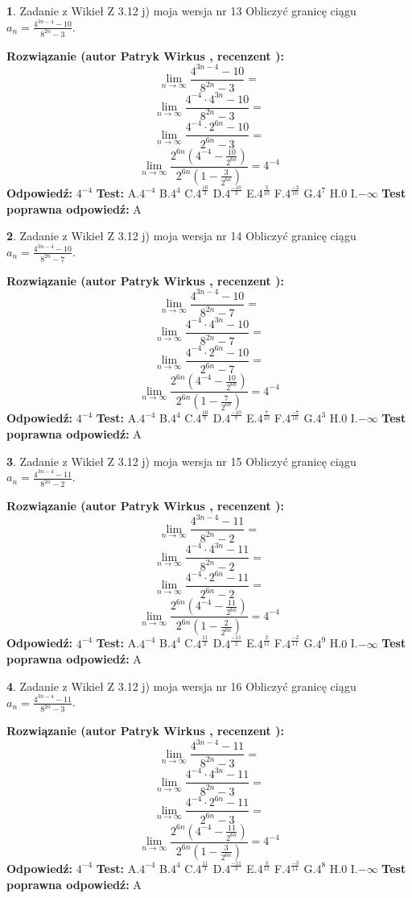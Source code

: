\documentclass[12pt, a4paper]{article}
\theoremstyle{definition} %
\newtheorem{zad}{}
\newcommand{\zadStart}[1]{\begin{zad}#1\newline}
\newcommand{\zadStop}{\end{zad}}
\newcommand{\rozwStart}[2]{\noindent \textbf{Rozwiązanie (autor #1 , recenzent #2): }\newline}
\newcommand{\rozwStop}{\newline}
\newcommand{\odpStart}{\noindent \textbf{Odpowiedź:}\newline}
\newcommand{\odpStop}{\newline}
\newcommand{\testStart}{\noindent \textbf{Test:}\newline}
\newcommand{\testStop}{\newline}
\newcommand{\kluczStart}{\noindent \textbf{Test poprawna odpowiedź:}\newline}
\newcommand{\kluczStop}{\newline}
\begin{document}
\zadStart{Zadanie z Wikieł Z 3.12 j) moja wersja nr 13}
Obliczyć granicę ciągu $a_{n}=\frac{4^{3n-4}-10}{8^{2n}-3}$.
\zadStop
\rozwStart{Patryk Wirkus}{}
$$\lim\limits_{n\to\infty}\frac{4^{3n-4}-10}{8^{2n}-3}=$$
$$\lim\limits_{n\to\infty}\frac{4^{-4} \cdot 4^{3n}-10}{8^{2n}-3}=$$
$$\lim\limits_{n\to\infty}\frac{4^{-4} \cdot 2^{6n}-10}{2^{6n}-3}=$$
$$\lim\limits_{n\to\infty}\frac{2^{6n}(4^{-4} - \frac{10}{2^{6n}})}{2^{6n}(1-\frac{3}{2^{6n}})}= 4^{-4}$$
\rozwStop
\odpStart
$4^{-4}$
\odpStop
\testStart
A.$4^{-4}$
B.$4^{4}$
C.$4^{\frac{10}{3}}$
D.$4^{\frac{-10}{3}}$
E.$4^{\frac{3}{10}}$
F.$4^{\frac{-3}{10}}$
G.$4^{7}$
H.$0$
I.$-\infty$
\testStop
\kluczStart
A
\kluczStop



\zadStart{Zadanie z Wikieł Z 3.12 j) moja wersja nr 14}
Obliczyć granicę ciągu $a_{n}=\frac{4^{3n-4}-10}{8^{2n}-7}$.
\zadStop
\rozwStart{Patryk Wirkus}{}
$$\lim\limits_{n\to\infty}\frac{4^{3n-4}-10}{8^{2n}-7}=$$
$$\lim\limits_{n\to\infty}\frac{4^{-4} \cdot 4^{3n}-10}{8^{2n}-7}=$$
$$\lim\limits_{n\to\infty}\frac{4^{-4} \cdot 2^{6n}-10}{2^{6n}-7}=$$
$$\lim\limits_{n\to\infty}\frac{2^{6n}(4^{-4} - \frac{10}{2^{6n}})}{2^{6n}(1-\frac{7}{2^{6n}})}= 4^{-4}$$
\rozwStop
\odpStart
$4^{-4}$
\odpStop
\testStart
A.$4^{-4}$
B.$4^{4}$
C.$4^{\frac{10}{7}}$
D.$4^{\frac{-10}{7}}$
E.$4^{\frac{7}{10}}$
F.$4^{\frac{-7}{10}}$
G.$4^{3}$
H.$0$
I.$-\infty$
\testStop
\kluczStart
A
\kluczStop



\zadStart{Zadanie z Wikieł Z 3.12 j) moja wersja nr 15}
Obliczyć granicę ciągu $a_{n}=\frac{4^{3n-4}-11}{8^{2n}-2}$.
\zadStop
\rozwStart{Patryk Wirkus}{}
$$\lim\limits_{n\to\infty}\frac{4^{3n-4}-11}{8^{2n}-2}=$$
$$\lim\limits_{n\to\infty}\frac{4^{-4} \cdot 4^{3n}-11}{8^{2n}-2}=$$
$$\lim\limits_{n\to\infty}\frac{4^{-4} \cdot 2^{6n}-11}{2^{6n}-2}=$$
$$\lim\limits_{n\to\infty}\frac{2^{6n}(4^{-4} - \frac{11}{2^{6n}})}{2^{6n}(1-\frac{2}{2^{6n}})}= 4^{-4}$$
\rozwStop
\odpStart
$4^{-4}$
\odpStop
\testStart
A.$4^{-4}$
B.$4^{4}$
C.$4^{\frac{11}{2}}$
D.$4^{\frac{-11}{2}}$
E.$4^{\frac{2}{11}}$
F.$4^{\frac{-2}{11}}$
G.$4^{9}$
H.$0$
I.$-\infty$
\testStop
\kluczStart
A
\kluczStop



\zadStart{Zadanie z Wikieł Z 3.12 j) moja wersja nr 16}
Obliczyć granicę ciągu $a_{n}=\frac{4^{3n-4}-11}{8^{2n}-3}$.
\zadStop
\rozwStart{Patryk Wirkus}{}
$$\lim\limits_{n\to\infty}\frac{4^{3n-4}-11}{8^{2n}-3}=$$
$$\lim\limits_{n\to\infty}\frac{4^{-4} \cdot 4^{3n}-11}{8^{2n}-3}=$$
$$\lim\limits_{n\to\infty}\frac{4^{-4} \cdot 2^{6n}-11}{2^{6n}-3}=$$
$$\lim\limits_{n\to\infty}\frac{2^{6n}(4^{-4} - \frac{11}{2^{6n}})}{2^{6n}(1-\frac{3}{2^{6n}})}= 4^{-4}$$
\rozwStop
\odpStart
$4^{-4}$
\odpStop
\testStart
A.$4^{-4}$
B.$4^{4}$
C.$4^{\frac{11}{3}}$
D.$4^{\frac{-11}{3}}$
E.$4^{\frac{3}{11}}$
F.$4^{\frac{-3}{11}}$
G.$4^{8}$
H.$0$
I.$-\infty$
\testStop
\kluczStart
A
\kluczStop
\end{document}
